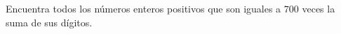 Encuentra todos los números enteros positivos que son iguales a $700$ veces la suma de sus dígitos.
